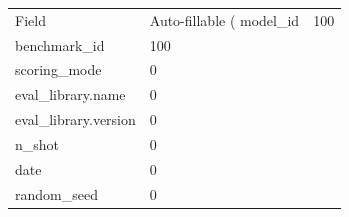 \begin{tabular}{ll}
\toprule
Field & Auto-fillable (%
\midrule
model_id & 100 \\
benchmark_id & 100 \\
scoring_mode & 0 \\
eval_library.name & 0 \\
eval_library.version & 0 \\
n_shot & 0 \\
date & 0 \\
random_seed & 0 \\
\bottomrule
\end{tabular}
